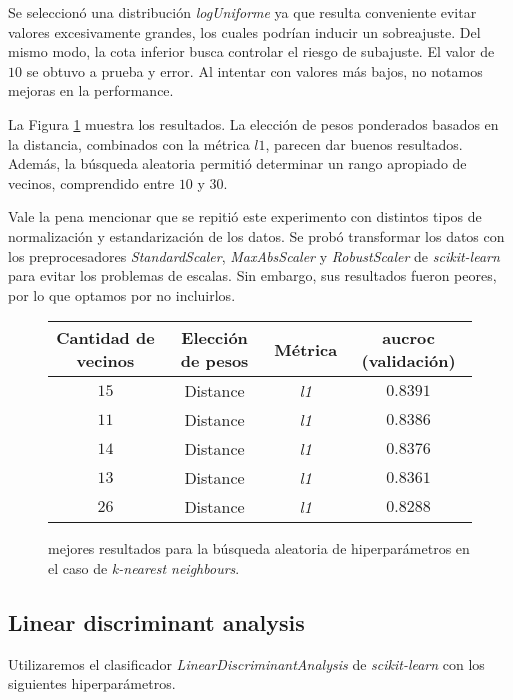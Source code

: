 Se seleccionó una distribución \textit{logUniforme} ya que resulta conveniente evitar valores excesivamente grandes, los cuales podrían inducir un sobreajuste. Del mismo modo, la cota inferior busca controlar el riesgo de subajuste. El valor de $10$ se obtuvo a prueba y error. Al intentar con valores más bajos, no notamos mejoras en la performance. 

La Figura \ref{knn} muestra los resultados. La elección de pesos ponderados basados en la distancia, combinados con la métrica $l1$, parecen dar buenos resultados. Además, la búsqueda aleatoria permitió determinar un rango apropiado de vecinos, comprendido entre $10$ y $30$.

Vale la pena mencionar que se repitió este experimento con distintos tipos de normalización y estandarización de los datos. Se probó transformar los datos con los preprocesadores \textit{StandardScaler}, \textit{MaxAbsScaler} y \textit{RobustScaler} de \textit{scikit-learn} para evitar los problemas de escalas. Sin embargo, sus resultados fueron peores, por lo que optamos por no incluirlos.
  
\vspace{0.5em}
\begin{figure}[!htbp]
    \begin{center}
        \begin{tabular}{ |c|c|c|c| } 
         \hline
        Cantidad de vecinos & Elección de pesos & Métrica & aucroc (validación) \\
        \hline
        $15$             & Distance          & \textit{l1} & $0.8391$  \\ 
        $11$             & Distance          & \textit{l1} & $0.8386$  \\
        $14$             & Distance          & \textit{l1} & $0.8376$  \\ 
        $13$             & Distance          & \textit{l1} & $0.8361$  \\
        $26$             & Distance          & \textit{l1} & $0.8288$  \\ 
        \hline
        \end{tabular}
    \end{center}
    \caption{mejores resultados para la búsqueda aleatoria de hiperparámetros en el caso de \textit{k-nearest neighbours}.} \label{knn}
\end{figure}

\subsection{Linear discriminant analysis}
Utilizaremos el clasificador \textit{LinearDiscriminantAnalysis} de \textit{scikit-learn} con los siguientes hiperparámetros. 

